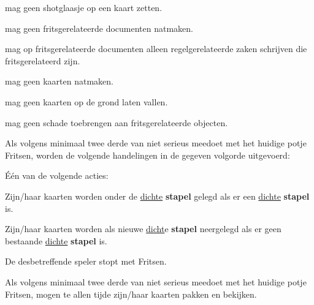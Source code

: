 \vervolgLijst{}
    \item \EenSpeler mag geen shotglaasje op een kaart zetten.
\eindLijst{} 

\vervolgLijst{}
    \item \EenSpeler mag geen fritsgerelateerde documenten natmaken.
\eindLijst{} 

\vervolgLijst{}
    \item \EenSpeler mag op fritsgerelateerde documenten alleen regelgerelateerde zaken schrijven die fritsgerelateerd zijn.
\eindLijst{}

\vervolgLijst{}
    \item \EenSpeler mag geen kaarten natmaken.
\eindLijst{}  

\vervolgLijst{}
    \item \EenSpeler mag geen kaarten op de grond laten vallen.
\eindLijst{}  

\vervolgLijst{}
    \item \EenSpeler mag geen schade toebrengen aan fritsgerelateerde objecten. 
\eindLijst{}



\vervolgLijst{}
    \item Als \eenSpeler volgens minimaal twee derde van \alleSpelers niet serieus meedoet met het huidige potje Fritsen, worden de volgende handelingen in de gegeven volgorde uitgevoerd:
    \numeriekeLijst{}
        \item Één van de volgende acties:
        \puntLijst{}
            \item Zijn/haar kaarten worden onder de \ul{dichte} \textbf{stapel} gelegd als er een \ul{dichte} \textbf{stapel} is. 
            \item Zijn/haar kaarten worden als nieuwe \ul{dicht}e \textbf{stapel} neergelegd als er geen bestaande \ul{dichte} \textbf{stapel} is. 
        \eindPuntLijst{}
        \item De desbetreffende speler stopt met Fritsen.
    \eindNumeriekeLijst{}
\eindLijst{}

\vervolgLijst{}
    \item Als \eenSpeler volgens minimaal twee derde van \alleSpelers niet serieus meedoet met het huidige potje Fritsen, mogen \alleSpelers te allen tijde zijn/haar kaarten pakken en bekijken.
\eindLijst{}


